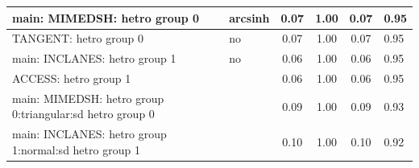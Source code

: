 \begin{table}
\begin{center}
\begin{tabular}{|l|l|c|c|c|l|}
			\hline
			main: MIMEDSH: hetro group 0 & arcsinh & 0.07 & 1.00 & 0.07 & 0.95 \\
			\hline
			TANGENT: hetro group 0 & no & 0.07 & 1.00 & 0.07 & 0.95 \\
			\hline
			main: INCLANES: hetro group 1 & no & 0.06 & 1.00 & 0.06 & 0.95 \\
			\hline
			ACCESS: hetro group 1 &  & 0.06 & 1.00 & 0.06 & 0.95 \\
			\hline
			main: MIMEDSH: hetro group 0:triangular:sd  hetro group 0 &  & 0.09 & 1.00 & 0.09 & 0.93 \\
			\hline
			main: INCLANES: hetro group 1:normal:sd  hetro group 1 &  & 0.10 & 1.00 & 0.10 & 0.92 \\
			\hline
		\end{tabular}
	\end{center}
\end{table}